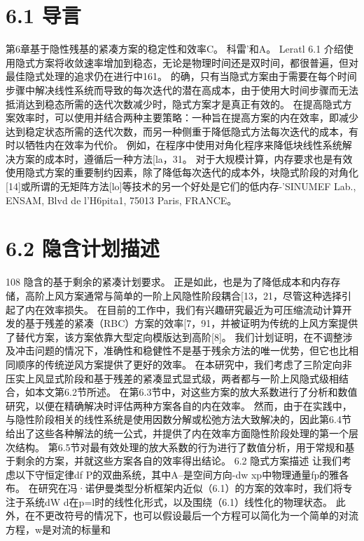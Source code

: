 \documentclass[UTF8,11pt,a4paper,openany,fontset=fandol]{ctexbook}
\begin{document}
\section{6.1 导言}
第6章基于隐性残基的紧凑方案的稳定性和效率C。 科雷'和A。 Leratl 6.1 介绍使用隐式方案将收敛速率增加到稳态，无论是物理时间还是双时间，都很普遍，但对最佳隐式处理的追求仍在进行中161。 的确，只有当隐式方案由于需要在每个时间步骤中解决线性系统而导致的每次迭代的潜在高成本，由于使用大时间步骤而无法抵消达到稳态所需的迭代次数减少时，隐式方案才是真正有效的。 在提高隐式方案效率时，可以使用并结合两种主要策略：一种旨在提高方案的内在效率，即减少达到稳定状态所需的迭代次数，而另一种侧重于降低隐式方法每次迭代的成本，有时以牺牲内在效率为代价。 例如，在程序中使用对角化程序来降低块线性系统解决方案的成本时，遵循后一种方法[la，31。 对于大规模计算，内存要求也是有效使用隐式方案的重要制约因素，除了降低每次迭代的成本外，块隐式阶段的对角化[14]或所谓的无矩阵方法[lo]等技术的另一个好处是它们的低内存-'SINUMEF Lab., ENSAM, Blvd de l'H6pita1, 75013 Paris, FRANCE。

\section{6.2 隐含计划描述}
108 隐含的基于剩余的紧凑计划要求。 正是如此，也是为了降低成本和内存存储，高阶上风方案通常与简单的一阶上风隐性阶段耦合[13，21，尽管这种选择引起了内在效率损失。 在目前的工作中，我们有兴趣研究最近为可压缩流动计算开发的基于残差的紧凑（RBC）方案的效率[7，91，并被证明为传统的上风方案提供了替代方案，该方案依靠大型定向模版达到高阶[8]。 我们计划证明，在不调整涉及冲击问题的情况下，准确性和稳健性不是基于残余方法的唯一优势，但它也比相同顺序的传统逆风方案提供了更好的效率。 在本研究中，我们考虑了三阶定向非压实上风显式阶段和基于残差的紧凑显式显式级，两者都与一阶上风隐式级相结合，如本文第6.2节所述。 在第6.3节中，对这些方案的放大系数进行了分析和数值研究，以便在精确解决时评估两种方案各自的内在效率。 然而，由于在实践中，与隐性阶段相关的线性系统是使用因数分解或松弛方法大致解决的，因此第6.4节给出了这些各种解法的统一公式，并提供了内在效率方面隐性阶段处理的第一个层次结构。 第6.5节对最有效处理的放大系数的行为进行了数值分析，用于常规和基于剩余的方案，并就这些方案各自的效率得出结论。 6.2 隐式方案描述 让我们考虑以下守恒定律df P的双曲系统，其中A--是空间方向-dw xp中物理通量fp的雅各布。 在研究在冯·诺伊曼类型分析框架内近似（6.1）的方案的效率时，我们将专注于系统dW d在p=l时的线性化形式，以及围绕（6.1）线性化的物理状态。 此外，在不更改符号的情况下，也可以假设最后一个方程可以简化为一个简单的对流方程，w是对流的标量和
\end{document}
